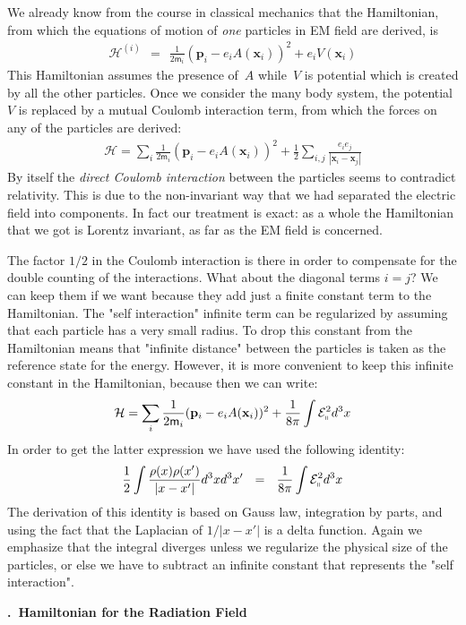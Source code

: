 \documentclass[onecolumn,fleqn, 11pt]{revtex4}
\newcommand{\mass}{\mathsf{m}}
\newcommand{\beq}{\begin{eqnarray}}
\newcommand{\eeq}{\end{eqnarray}}
\renewcommand{\thesubsection}{\arabic{subsection}}
\renewcommand{\thesubsubsection}{\arabic{subsubsection}}
\newcommand{\sheadC}[1]
{
\addtocounter{subsubsection}{1}
\vspace{5mm}
{\bf \thesubsection.\thesubsubsection \ #1}  
\nopagebreak
\phantomsection
}
\begin{document}
 
We already know from the course in classical mechanics 
that the Hamiltonian, from which the equations of motion   
of {\em one} particles in EM field are derived, is    
\beq
\mathcal{H}^{(i)} \ \ = \ \  \frac{1}{2\mass_i} 
(\mathbf{p}_i - e_i A(\mathbf{x}_i))^{2} 
+ e_iV(\mathbf{x}_i)   
\eeq
This Hamiltonian assumes the presence of~$A$  
while~$V$ is potential which is created by all the other 
particles. Once we consider the many body system, 
the potential~$V$ is replaced by a mutual Coulomb interaction term,  
from which the forces on any of the particles are derived:
\beq
\mathcal{H} = \sum_i \frac{1}{2\mass_i} (\mathbf{p}_i-e_iA(\mathbf{x}_i))^{2} 
+  \frac{1}{2} \sum_{i,j} 
\frac{e_i e_j}{|\mathbf{x}_{i}-\mathbf{x}_{j}|}   
\eeq
By itself the {\em direct Coulomb interaction} between 
the particles seems to contradict relativity.  
This is due to the non-invariant way that we 
had separated the electric field into components.    
In fact our treatment is exact: as a whole the Hamiltonian 
that we got is Lorentz invariant, 
as far as the EM field is concerned. 

The factor ${1/2}$ in the Coulomb interaction is there in order 
to compensate for the double counting of the interactions.
What about the diagonal terms $i=j$? We can keep them 
if we want because they add just a finite constant 
term to the Hamiltonian. The "self interaction" infinite 
term can be regularized by assuming that each particle 
has a very small radius. To drop this constant from 
the Hamiltonian means that "infinite distance" between 
the particles is taken as the reference state for the energy.  
However, it is more convenient to keep this infinite 
constant in the Hamiltonian, because then we can write:
\beq
\mathcal{H} = \sum_i \frac{1}{2\mass_i} (\mathbf{p}_i-e_iA(\mathbf{x}_i))^{2} 
+  \frac{1}{8\pi} \int \mathcal{E}_{\shortparallel}^{2} d^3x
\eeq
In order to get the latter expression we have used 
the following identity:
\beq
\frac{1}{2}\int \frac{\rho(x)\rho(x')}{|x-x'|} d^3x d^3x' 
\ \ = \ \ 
\frac{1}{8\pi} \int \mathcal{E}_{\shortparallel}^{2} d^3x 
\eeq
The derivation of this identity is based on Gauss law, 
integration by parts, and using the fact that the Laplacian 
of $1/|x-x'|$ is a delta function.  
Again we emphasize that the integral diverges 
unless we regularize the physical size 
of the particles, or else we have to subtract 
an infinite constant 
that represents the "self interaction".          



\sheadC{Hamiltonian for the Radiation Field}
\end{document}
